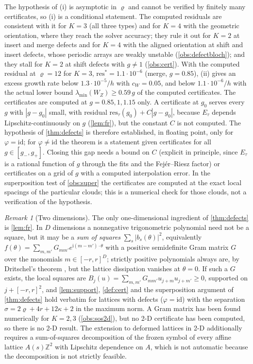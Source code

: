 \documentclass[11pt,a4paper]{article}
\theoremstyle{plain}
\theoremstyle{definition}
\theoremstyle{remark}
\newtheorem{remark}[theorem]{Remark}
\numberwithin{equation}{section}
\newcommand{\Z}{\mathbb{Z}}
\newcommand{\res}{\mathrm{res}}
\newcommand{\ii}{\mathrm{i}}
\begin{document}
The hypothesis of (i) is asymptotic in $\varrho$ and cannot be verified by finitely many certificates, so (i) is a conditional statement. The computed residuals are consistent with it for $K=3$ (all three types) and for $K=4$ with the geometric orientation, where they reach the solver accuracy; they rule it out for $K=2$ at insert and merge defects and for $K=4$ with the aligned orientation at shift and insert defects, whose periodic arrays are weakly unstable (\cref{obs:defectbloch}); and they stall for $K=2$ at shift defects with $g\ne1$ (\cref{obs:cert}). With the computed residual at $\varrho=12$ for $K=3$, $\res^*=1.1\cdot10^{-6}$ (merge, $g=0.85$), (ii) gives an excess growth rate below $1.3\cdot10^{-5}/h$ with $c_W=0.05$, and below $1.1\cdot10^{-6}/h$ with the actual lower bound $\lambda_{\min}(W_Z)\ge0.59\,g$ of the computed certificates. The certificates are computed at $g=0.85,1,1.15$ only. A certificate at $g_0$ serves every $g$ with $|g-g_0|$ small, with residual $\res_\tau(g_0)+C|g-g_0|$, because $E_\tau$ depends Lipschitz-continuously on $g$ (\cref{lem:fr}), but the constant $C$ is not computed. The hypothesis of \cref{thm:defects} is therefore established, in floating point, only for $\varphi=\mathrm{id}$; for $\varphi\ne\mathrm{id}$ the theorem is a statement given certificates for all $g\in[g_-,g_+]$. Closing this gap needs a bound on $C$ (explicit in principle, since $E_\tau$ is a rational function of $g$ through the fits and the Fej\'er--Riesz factor) or certificates on a grid of $g$ with a computed interpolation error. In the superposition test of \cref{obs:super} the certificates are computed at the exact local spacings of the particular clouds; this is a numerical check for those clouds, not a verification of the hypothesis.

\begin{remark}[Two dimensions]\label{rem:defects2d}
The only one-dimensional ingredient of \cref{thm:defects} is \cref{lem:fr}. In $D$ dimensions a nonnegative trigonometric polynomial need not be a square, but it may be a \emph{sum of squares} $\sum_s|b_s(\theta)|^2$, equivalently $f(\theta)=\sum_{m,m'}G_{mm'}e^{\ii(m-m')\cdot\theta}$ with a positive semidefinite Gram matrix $G$ over the monomials $m\in[-r,r]^D$; strictly positive polynomials always are, by Dritschel's theorem \cite{Dritschel2004,DritschelRovnyak2010}, but the lattice dissipation vanishes at $\theta=0$. If such a $G$ exists, the local squares are $B_j(u)=\sum_{m,m'}G_{mm'}u_{j+m}u_{j+m'}\ge0$, supported on $j+[-r,r]^2$, and \cref{lem:support}, \cref{def:cert} and the superposition argument of \cref{thm:defects} hold verbatim for lattices with defects ($\varphi=\mathrm{id}$) with the separation $\sigma=2\varrho+4r+12\kappa+2$ in the maximum norm. A Gram matrix has been found numerically for $K=2,3$ (\cref{obs:sos2d}), but no 2-D certificate has been computed, so there is no 2-D result. The extension to deformed lattices in 2-D additionally requires a sum-of-squares decomposition of the frozen symbol of every affine lattice $A(s)\Z^2$ with Lipschitz dependence on $A$, which is not automatic because the decomposition is not strictly feasible.
\end{remark}
\end{document}
